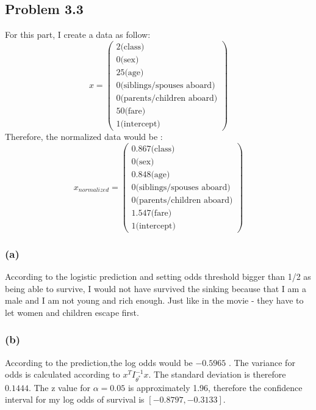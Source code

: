 \documentclass{article}
\begin{document}
\subsection*{Problem 3.3}
	For this part, I create a data as follow:
	\begin{equation*}
		x=  \begin{pmatrix} 2 \text{(class)}\\ 0 \text{(sex)}\\ 25\text{(age)}\\ 0\text{(siblings/spouses aboard)}\\0\text{(parents/children aboard)}\\ 50\text{(fare)}\\1\text{(intercept)} \end{pmatrix} 	\end{equation*}
	Therefore, the normalized data would be :
	\begin{equation*}
		x_{normalized} =  \begin{pmatrix} 0.867 \text{(class)}\\ 0 \text{(sex)}\\ 0.848\text{(age)}\\ 0\text{(siblings/spouses aboard)}\\0\text{(parents/children aboard)}\\ 1.547\text{(fare)}\\1\text{(intercept)} \end{pmatrix} 	\end{equation*}

\subsubsection*{(a)}
	According to the logistic prediction and setting odds threshold bigger than 1/2 as being able to survive,  I would not have survived the sinking because that I am a male and I am not young and rich enough. Just like in the movie - they have to let women and children escape first.
	
\subsubsection*{(b)}
	According to the prediction,the log odds would be $-0.5965$ . The variance for odds is calculated according to $x^{T}I^{-1}_{\theta^{*}}x$. The standard deviation is therefore $0.1444$. The z value for $\alpha = 0.05$ is approximately 1.96, therefore the confidence interval for my log odds of survival is $[-0.8797, -0.3133 ]$.
	
\end{document}
